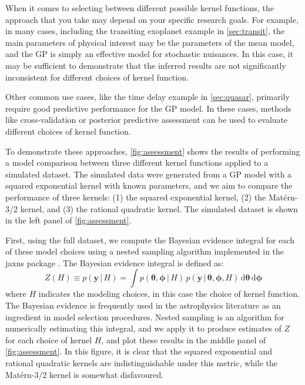 \documentclass[letterpaper]{ar-1col}
\newcommand{\ydata}{\ensuremath{\boldsymbol{y}}}
\newcommand{\hyperparams}{\ensuremath{\boldsymbol{\phi}}}
\newcommand{\meanparams}{\ensuremath{\boldsymbol{\theta}}}
\begin{document}
When it comes to selecting between different possible kernel functions, the approach that you take may depend on your specific research goals.
For example, in many cases, including the transiting exoplanet example in \autoref{sec:transit}, the main parameters of physical interest may be the parameters of the mean model, and the GP is simply an effective model for stochastic nuisances.
In this case, it may be sufficient to demonstrate that the inferred results are not significantly inconsistent for different choices of kernel function.

Other common use cases, like the time delay example in \autoref{sec:quasar}, primarily require good predictive performance for the GP model.
In these cases, methods like cross-validation \citep[e.g.,][]{gelfand1992model} or posterior predictive assessment \citep[e.g.,][]{gelman1996posterior} can be used to evaluate different choices of kernel function.

To demonstrate these approaches, \autoref{fig:assessment} shows the results of performing a model comparison between three different kernel functions applied to a simulated dataset.
The simulated data were generated from a GP model with a squared exponential kernel with known parameters, and we aim to compare the performance of three kernels: (1) the squared exponential kernel, (2) the Mat\'ern-3/2 kernel, and (3) the rational quadratic kernel.
The simulated dataset is shown in the left panel of \autoref{fig:assessment}.

First, using the full dataset, we compute the Bayesian evidence integral for each of these model choices using a nested sampling algorithm implemented in the \textsf{jaxns} package \citep{jaxns}.
The Bayesian evidence integral is defined as:
\begin{equation}
  Z(H) \equiv p(\ydata\,|\,H) = \int p(\meanparams,\hyperparams\,|\,H)\,p(\ydata\,|\,\meanparams,\hyperparams,H)\,\mathrm{d}\meanparams\,\mathrm{d}\hyperparams
\end{equation}
where $H$ indicates the modeling choices, in this case the choice of kernel function.
The Bayesian evidence is frequently used in the astrophysics literature as an ingredient in model selection procedures.
Nested sampling is an algorithm for numerically estimating this integral, and we apply it to produce estimates of $Z$ for each choice of kernel $H$, and plot these results in the middle panel of \autoref{fig:assessment}.
In this figure, it is clear that the squared exponential and rational quadratic kernels are indistinguishable under this metric, while the Mat\'ern-3/2 kernel is somewhat disfavoured. 
\end{document}
